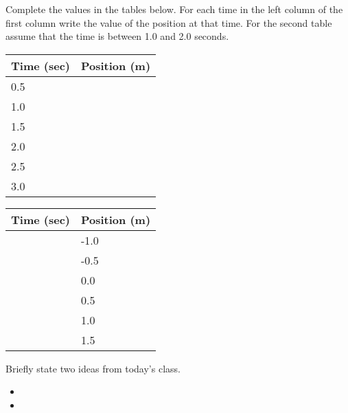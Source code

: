 \begin{problem}
\begin{subproblem}
    \scalebox{0.4}{}

    Complete the values in the tables below. For each time in the left
    column of the first column write the value of the position at that
    time. For the second table assume that the time is between 1.0 and
    2.0 seconds.

    \begin{tabular}{l|l}
      Time (sec) & Position (m) \\ \hline
      0.5 & \\ [12pt]
      1.0 & \\  [12pt]
      1.5 & \\  [12pt]
      2.0 & \\  [12pt]
      2.5 & \\  [12pt]
      3.0 
    \end{tabular}

    \begin{tabular}{l|l}
      Time (sec) & Position (m) \\ \hline
       & -1.0 \\ [12pt]
       & -0.5 \\  [12pt]
       &  0.0 \\  [12pt]
       &  0.5 \\  [12pt]
       &  1.0 \\  [12pt]
       &  1.5
    \end{tabular}


  \end{subproblem}


\end{problem}


\postClass

\begin{problem}
\item Briefly state two ideas from today's class.
  \begin{itemize}
  \item 
  \item 
  \end{itemize}
\item 
  \begin{subproblem}
    \item
  \end{subproblem}
\end{problem}




